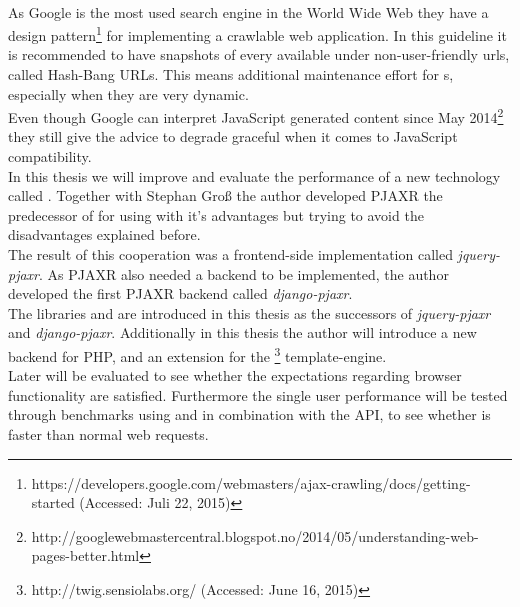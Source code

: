 \\
As Google is the most used search engine in the World Wide Web they have a design pattern\footnote{https://developers.google.com/webmasters/ajax-crawling/docs/getting-started (Accessed: Juli 22, 2015)} for implementing a crawlable \ajax{} web application.
In this guideline it is recommended to have snapshots of every \webPage{} available under non-user-friendly \gls{url}s, called Hash-Bang URLs.
This means additional maintenance effort for \webSite{}s, especially when they are very dynamic.
\\
Even though Google can interpret JavaScript generated content since May 2014\footnote{http://googlewebmastercentral.blogspot.no/2014/05/understanding-web-pages-better.html} they still give the advice to degrade graceful when it comes to JavaScript compatibility.
\\
In this thesis we will improve and evaluate the performance of a new technology called \lare{}.
Together with Stephan Gro{\ss} the author developed PJAXR the predecessor of \lare{} for using \ajax{} with it's advantages but trying to avoid the disadvantages explained before.
\\
The result of this cooperation was a frontend-side implementation called \emph{jquery-pjaxr}.
As PJAXR also needed a backend to be implemented, the author developed the first PJAXR backend called \emph{django-pjaxr}.
\\
The libraries \lareJS{} and \djangoLare{} are introduced in this thesis as the successors of \emph{jquery-pjaxr} and \emph{django-pjaxr}.
Additionally in this thesis the author will introduce a new \lare{} backend for PHP, \emph{\phpLare{}} and \emph{\twigLare{}} an extension for the \twig{}\footnote{http://twig.sensiolabs.org/ (Accessed: June 16, 2015)} template-engine.
\\
Later \lare{} will be evaluated to see whether the expectations regarding browser functionality are satisfied.
Furthermore the single user performance will be tested through benchmarks using \curl{} and \selenium{} in combination with the \webdriver{} API, to see whether \lare{} is faster than normal web requests.
